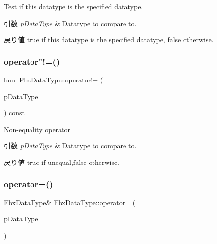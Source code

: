 Test if this datatype is the specified datatype. 
\begin{DoxyParams}{引数}
{\em p\+Data\+Type} & Datatype to compare to. \\
\hline
\end{DoxyParams}
\begin{DoxyReturn}{戻り値}
{\ttfamily true} if this datatype is the specified datatype, {\ttfamily false} otherwise. 
\end{DoxyReturn}
\mbox{\label{class_fbx_data_type_a219d626fd80822f8d1f45b59b4dd1837}} 
\subsubsection{\texorpdfstring{operator"!=()}{operator!=()}}
{\footnotesize\ttfamily bool Fbx\+Data\+Type\+::operator!= (\begin{DoxyParamCaption}\item[{const \hyperlink{class_fbx_data_type}{Fbx\+Data\+Type} \&}]{p\+Data\+Type }\end{DoxyParamCaption}) const}

Non-\/equality operator 
\begin{DoxyParams}{引数}
{\em p\+Data\+Type} & Datatype to compare to. \\
\hline
\end{DoxyParams}
\begin{DoxyReturn}{戻り値}
{\ttfamily true} if unequal,{\ttfamily false} otherwise. 
\end{DoxyReturn}
\mbox{\label{class_fbx_data_type_adb38a598b2865f0dc137a2ad298987d9}} 
\subsubsection{\texorpdfstring{operator=()}{operator=()}}
{\footnotesize\ttfamily \hyperlink{class_fbx_data_type}{Fbx\+Data\+Type}\& Fbx\+Data\+Type\+::operator= (\begin{DoxyParamCaption}\item[{const \hyperlink{class_fbx_data_type}{Fbx\+Data\+Type} \&}]{p\+Data\+Type }\end{DoxyParamCaption})}

